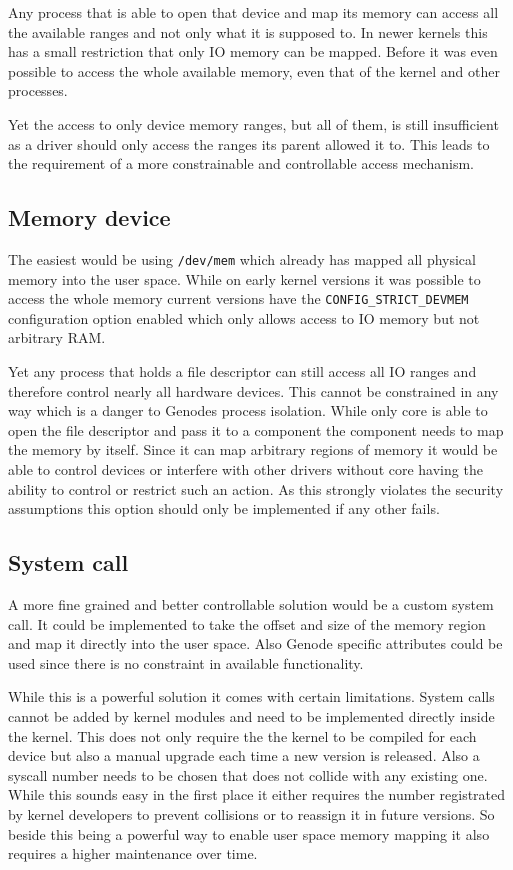 \documentclass[
a4paper,
12pt,
notitlepage,
parskip=half,
DIV=11,
]{scrbook}
\begin{document}
		Any process that is able to open that device and map its memory can access all the available ranges and not only what it is supposed to.
		In newer kernels this has a small restriction that only IO memory can be mapped.
		Before it was even possible to access the whole available memory, even that of the kernel and other processes. \citep{devmem}
		
		Yet the access to only device memory ranges, but all of them, is still insufficient as a driver should only access the ranges its parent allowed it to.
		This leads to the requirement of a more constrainable and controllable access mechanism.
		
		\subsection{Memory device}
		
		The easiest would be using \texttt{/dev/mem} which already has mapped all physical memory into the user space.
		While on early kernel versions it was possible to access the whole memory current versions have the \texttt{CONFIG\_STRICT\_DEVMEM} configuration option enabled which only allows access to IO memory but not arbitrary RAM.
		
		Yet any process that holds a file descriptor can still access all IO ranges and therefore control nearly all hardware devices.
		This cannot be constrained in any way which is a danger to Genodes process isolation.
		While only core is able to open the file descriptor and pass it to a component the component needs to map the memory by itself.
		Since it can map arbitrary regions of memory it would be able to control devices or interfere with other drivers without core having the ability to control or restrict such an action.
		As this strongly violates the security assumptions this option should only be implemented if any other fails. \citep{devmem} 
		
		\subsection{System call}
		
		A more fine grained and better controllable solution would be a custom system call.
		It could be implemented to take the offset and size of the memory region and map it directly into the user space.
		Also Genode specific attributes could be used since there is no constraint in available functionality.
		
		While this is a powerful solution it comes with certain limitations.
		System calls cannot be added by kernel modules and need to be implemented directly inside the kernel.
		This does not only require the the kernel to be compiled for each device but also a manual upgrade each time a new version is released.
		Also a syscall number needs to be chosen that does not collide with any existing one.
		While this sounds easy in the first place it either requires the number registrated by kernel developers to prevent collisions or to reassign it in future versions.
		So beside this being a powerful way to enable user space memory mapping it also requires a higher maintenance over time. \citep{syscall}
		
\end{document}
